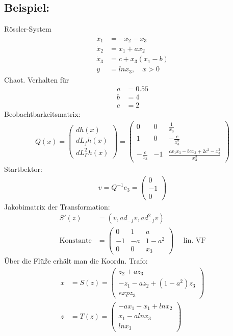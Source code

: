 \documentclass[ngerman]{tudscrreprt}
\begin{document}
\subsection*{Beispiel: }Rössler-System
\begin{align*}
\dot x_1 &= -x_2 - x_3\\ 
\dot x_2 &= x_1 + ax_2\\ 
\dot x_3 &= c + x_3(x_1 - b)\\ 
y &= lnx_3, \quad x>0
\end{align*}Chaot. Verhalten für \begin{align*} a &= 0.55\\ b &= 4\\ c&= 2\end{align*}
Beobachtbarkeitsmatrix: \begin{align*}
Q(x) = \begin{pmatrix} dh(x)\\ dL_fh(x)\\ dL_F^2h(x)\end{pmatrix} = \begin{pmatrix}
0 & 0 & \frac{1}{x_3}\\ 
1 & 0 & -\frac{c}{x_3^2}\\ 
-\frac{c}{x_3} & -1& \frac{cx_1 x_3 - bc x_3 + 2c^2 - x_3^3}{x_3^3}
\end{pmatrix}
\end{align*}Startbektor: \begin{align*}
v = Q^{-1} e_3 = \begin{pmatrix} 0 \\ -1\\ 0\end{pmatrix}
\end{align*}Jakobimatrix der Transformation: \begin{align*}
S'(z) &= (v, ad_{-f}v, ad_{-f}^2 v) \\ 
\text{Konstante} &= \begin{pmatrix}
0 & 1 & a\\ 
-1& -a& 1-a^2\\ 
0 & 0 & x_3
\end{pmatrix} \quad \text{ lin. VF}
\end{align*}
Über die Flüße erhält man die Koordn. Trafo: 
\begin{align*}
x &=S(z) = \begin{pmatrix} z_2 + az_3\\ -z_1 - az_2 + (1-a^2)z_3\\ exp z_3\end{pmatrix} \\ 
z &= T(z) = \begin{pmatrix} -a x_1 - x_1 + lnx_2\\ x_1 - a ln x_3\\ ln x_3 \end{pmatrix}
\end{align*}
\end{document}

